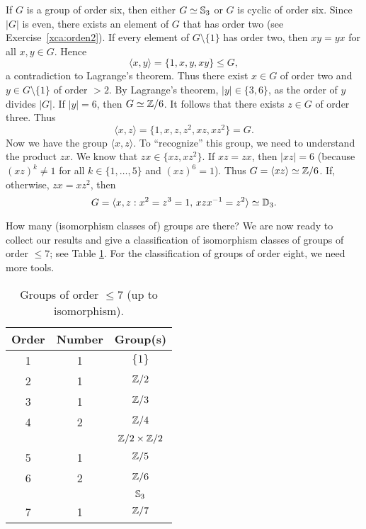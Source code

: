 \begin{example}
If $G$ is a group of order six, then
either $G\simeq\mathbb{S}_3$ or $G$ is cyclic of order six. 
Since $|G|$ is even, there exists an element of $G$ 
that has order two (see Exercise~\ref{xca:orden2}). 
If every element of $G\setminus\{1\}$ has order two, then
$xy=yx$ for all $x,y\in G$. Hence 
\[
\langle x,y\rangle=\{1,x,y,xy\}\leq G,
\]
a contradiction to Lagrange's theorem. Thus there exist 
$x\in G$ of order two 
and $y\in G\setminus\{1\}$ of order $>2$. 
By Lagrange's theorem, $|y|\in\{3,6\}$, 
as the order of $y$ divides $|G|$. If 
$|y|=6$, 
then $G\simeq\mathbb{Z}/6$. It follows that there exists 
$z\in G$ of order three. Thus 
\[
\langle x,z\rangle=\{1,x,z,z^2,xz,xz^2\}=G.
\]
Now we have the group $\langle x,z\rangle$. To ``recognize'' this group,
we need to understand the product $zx$. We know that
$zx\in\{xz,xz^2\}$. If $xz=zx$, then $|xz|=6$ (because
$(xz)^k\ne1$ for all $k\in\{1,\dots,5\}$ and
$(xz)^6=1$). Thus 
$G=\langle xz\rangle\simeq\mathbb{Z}/6$. If, otherwise, 
$zx=xz^2$, then 
\[
G=\langle x,z:x^2=z^3=1,\,xzx^{-1}=z^2\rangle\simeq\mathbb{D}_3.
\]
\end{example}

How many (isomorphism classes of) groups are there? We are now 
ready to collect our results and give a classification 
of isomorphism classes of groups of order $\leq7$; see
Table \ref{tab:grupos<8}. For the classification of groups
of order eight, we need more tools. 

\begin{table}[ht]
    \caption{Groups of order $\leq7$ (up to isomorphism).}

    \begin{tabular}{|c|c|c|}
    \hline
    Order & Number & Group(s)\\
    \hline
        1 & 1 & $\{1\}$ \\
        2 & 1 & $\mathbb{Z}/2$ \\
        3 & 1 & $\mathbb{Z}/3$ \\
        4 & 2 & $\mathbb{Z}/4$ \\
        && $\mathbb{Z}/2\times\mathbb{Z}/2$ \\
        5 & 1 & $\mathbb{Z}/5$ \\
        6 & 2 & $\mathbb{Z}/6$\\
        &&$\mathbb{S}_3$ \\
        7 & 1 & $\mathbb{Z}/7$ \\
    \hline
    \end{tabular}
    \label{tab:grupos<8}
\end{table}

